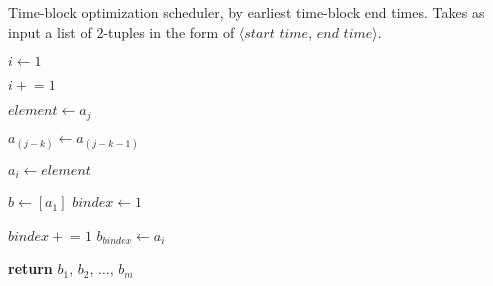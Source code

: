 \documentclass[a4paper, 12pt]{article}
\newcommand{\pluseq}{\mathrel{+}=}
\begin{document}
	
	\begin{algorithm}

		\renewcommand{\thealgorithm}{3.1.57}
		
		\caption{Time-block optimization scheduler, by earliest time-block end times. Takes as input a list of $2$-tuples in the form of \newline $\langle start$ $time$, $end$ $time \rangle$.}
		
		\begin{algorithmic}[1]
			
			\newline {}
			
				\State $i \gets 1$
				
					\State $i \pluseq 1$
				\EndWhile
				
				\State $element \gets a_j$
				
					\State $a_{(j-k)} \gets a_{(j-k-1)}$
				\EndFor
				
				\State $a_i \gets element$
				
			\EndFor {}
			
			\State $b \gets [a_1]$ 
			\State $bindex \gets 1$
			
			 
					\State $bindex \pluseq 1$
					\State $b_{bindex} \gets a_i$
				\EndIf
			\EndFor
			
			\State \textbf{return} $b_1$, $b_2$, $\dots$, $b_m$
			
			
			\EndProcedure
			
		\end{algorithmic}

	\end{algorithm}
\end{document}
